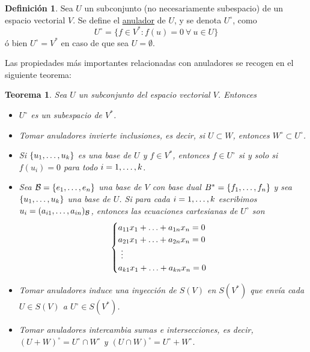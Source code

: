 \documentclass[12pt]{report}
\newtheorem{theorem}{Teorema}[chapter]
\theoremstyle{definition}
\newtheorem{definition}{Definición}[chapter]
\theoremstyle{definition}
\theoremstyle{remark}
\begin{document}
\begin{definition}
Sea $U$ un subconjunto (no necesariamente subespacio) de un espacio vectorial $V$. Se define el \ul{anulador} de $U$, y se denota $U^\circ$, como
\[U^\circ = \{f \in V^* \colon f(u)=0 \ \forall \ u \in U\}\]
ó bien $U^\circ = V^*$ en caso de que sea $U = \emptyset$.
\end{definition}

Las propiedades más importantes relacionadas con anuladores se recogen en el siguiente teorema:

\begin{theorem}
\label{teo0.4.}
    Sea $U$ un subconjunto del espacio vectorial $V$. Entonces
    \begin{itemize}
        \item[(i)] $U^\circ$ es un subespacio de $V^*$.
        \item[(ii)] Tomar anuladores invierte inclusiones, es decir, si $U \subset W$, entonces $W^\circ \subset U^\circ$.
        \item[(iii)] Si $\{u_1,\mathellipsis,u_k\}$ es una base de $U$ y $f \in V^*$, entonces $f \in U^\circ$ si y solo si $f(u_i)=0$ para todo $i = 1,\mathellipsis,k$.
        \item[(iv)] Sea $\mathcal{B} = \{e_1,\mathellipsis,e_n\}$ una base de $V$ con base dual $B^* = \{f_1,\mathellipsis,f_n\}$ y sea $\{u_1,\mathellipsis,u_k\}$ una base de $U$. Si para cada $i = 1,\mathellipsis,k$ escribimos $u_i = (a_{i1},\mathellipsis,a_{in})_\mathcal{B}$, entonces las ecuaciones cartesianas de $U^\circ$ son
        \[
        \begin{cases}
            a_{11}x_1+\mathellipsis+a_{1n}x_n = 0 \\
            a_{21}x_1+\mathellipsis+a_{2n}x_n = 0 \\
            \ \vdots \\
            a_{k1}x_1+\mathellipsis+a_{kn}x_n = 0
        \end{cases}
        \]
        \item[(v)] Tomar anuladores induce una inyección de $S(V)$ en $S(V^*)$ que envía cada $U \in S(V)$ a $U^\circ \in S(V^*)$.
        \item[(vi)] Tomar anuladores intercambia sumas e intersecciones, es decir, $(U+W)^\circ = U^\circ \cap W^\circ$ y $(U \cap W)^\circ = U^\circ + W^\circ$.
    \end{itemize}
\end{theorem}
\end{document}
